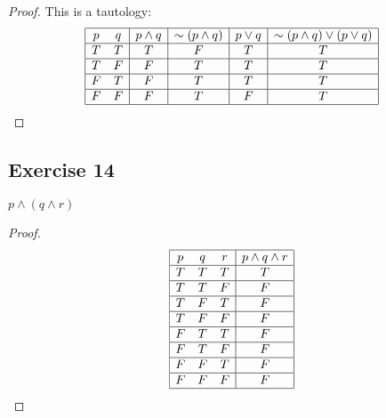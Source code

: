 \documentclass[14pt]{extarticle}
\begin{document}
\begin{proof}
    This is a tautology:
    $$
        \begin{array}{|cc|c|c|c|c|c|}
            \hline p & q & p \wedge q & {\sim (p \wedge q)} & p \vee q & {\sim(p \wedge q)} \vee (p \vee q) \\
            \hline T & T & T          & F                   & T        & T                                  \\
            \hline T & F & F          & T                   & T        & T                                  \\
            \hline F & T & F          & T                   & T        & T                                  \\
            \hline F & F & F          & T                   & F        & T                                  \\
            \hline
        \end{array}
    $$
\end{proof}

\subsection{Exercise 14}
$p \wedge (q \wedge r)$

\begin{proof}
    $$
        \begin{array}{|ccc|c|}
            \hline
            p & q & r & p \wedge q \wedge r \\
            \hline
            T & T & T & T                   \\
            \hline
            T & T & F & F                   \\
            \hline
            T & F & T & F                   \\
            \hline
            T & F & F & F                   \\
            \hline
            F & T & T & F                   \\
            \hline
            F & T & F & F                   \\
            \hline
            F & F & T & F                   \\
            \hline
            F & F & F & F                   \\
            \hline
        \end{array}
    $$
\end{proof}
\end{document}
